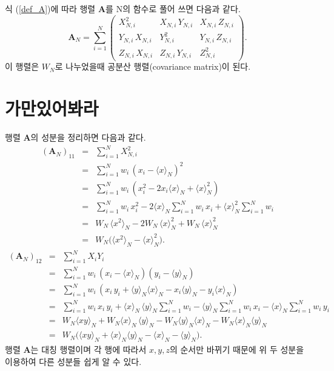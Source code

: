 \documentclass[chapter,a4paper,12pt]{oblivoir}
\begin{document}
식 (\ref{def_A})에 따라 행렬 $\mathbf{A}$를 N의 함수로 풀어 쓰면 다음과 같다.
\begin{equation} \label{matrix_A}
\mathbf{A}_N = \sum_{i=1}^N\left( \begin{array}{ccc}
  X_{N,i}^2 & X_{N,i}\,Y_{N,i} & X_{N,i}\,Z_{N,i} \\
  Y_{N,i}\,X_{N,i} & Y_{N,i}^2 & Y_{N,i}\,Z_{N,i} \\
  Z_{N,i}\,X_{N,i} & Z_{N,i}\,Y_{N,i} & Z_{N,i}^2
\end{array} \right).
\end{equation}
이 행렬은 $W_N$로 나누었을때 공분산 행렬(covariance matrix)이 된다.

\section{가만있어봐라}
행렬 $\mathbf{A}$의 성분을 정리하면 다음과 같다.
\begin{eqnarray}
\left(\mathbf{A}_{N}\right)_{11} &=& \sum_{i=1}^{N} X_{N,i}^2 \\
&=& \sum_{i=1}^{N} w_i\,(x_i - \langle x \rangle_{N})^2\nonumber\\
&=& \sum_{i=1}^{N} w_i\,(x_i^2 -2x_i\langle x \rangle_{N} + \langle x \rangle_{N}^2) \nonumber\\
&=& \sum_{i=1}^{N} w_i\,x_i^2 -2\langle x \rangle_{N}\sum_{i=1}^{N}w_i\,x_i + \langle x \rangle_{N}^2\sum_{i=1}^{N}w_i \nonumber\\
&=& W_{N}\,\langle x^2 \rangle_{N} -2W_{N}\,\langle x \rangle_{N}^2 + W_{N}\,\langle x \rangle_{N}^2 \nonumber\\
&=& W_{N}\Big(\langle x^2 \rangle_{N} -\langle x \rangle_{N}^2\Big). \nonumber
\end{eqnarray}
\begin{eqnarray}
\left(\mathbf{A}_{N}\right)_{12} &=& \sum_{i=1}^{N} X_iY_i \\
&=& \sum_{i=1}^{N} w_i\,(x_i - \langle x \rangle_{N})(y_i - \langle y \rangle_{N})\nonumber\\
&=& \sum_{i=1}^{N} w_i\,(x_i\,y_i + \langle y \rangle_{N}\langle x \rangle_{N} - x_i\langle y \rangle_{N} - y_i\langle x \rangle_{N} )\nonumber\\
&=& \sum_{i=1}^{N} w_i\,x_i\,y_i + \langle x \rangle_{N}\,\langle y \rangle_{N} \sum_{i=1}^{N} w_i - \langle y \rangle_{N} \sum_{i=1}^{N} w_i\,x_i - \langle x \rangle_{N} \sum_{i=1}^{N} w_i\,y_i \nonumber\\
&=& W_{N}\langle xy \rangle_{N}  + W_{N}\langle x \rangle_{N}\,\langle y \rangle_{N} - W_{N}\langle y \rangle_{N} \langle x \rangle_{N} - W_{N}\langle x \rangle_{N} \langle y \rangle_{N}\nonumber\\
&=& W_{N} \Big(\langle xy \rangle_{N} + \langle x \rangle_{N}\langle y \rangle_{N} - \langle x \rangle_{N} - \langle y \rangle_{N} \Big). \nonumber
\end{eqnarray}
행렬 $\mathbf{A}$는 대칭 행렬이며 각 행에 따라서 $x, y, z$의 순서만 바뀌기 때문에 위 두 성분을 이용하여 다른 성분들 쉽게 알 수 있다.
\end{document}
